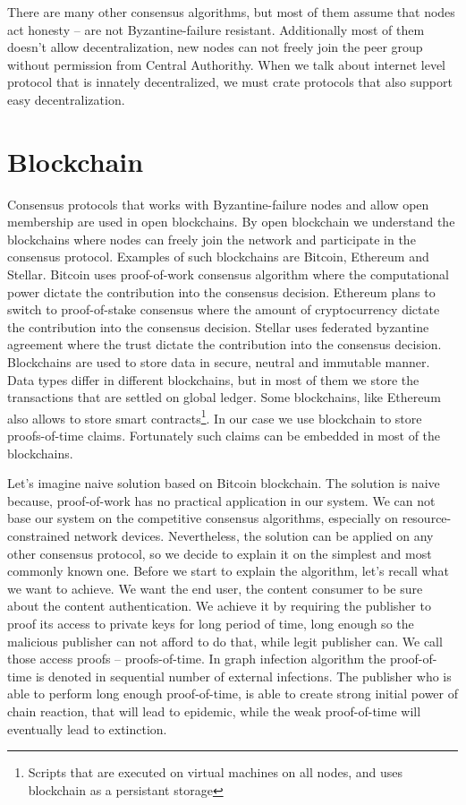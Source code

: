 \documentclass[nostrict]{szablonPG}
\begin{document}
There are many other consensus algorithms, but most of them assume that nodes act honesty -- are not Byzantine-failure resistant. Additionally most of them doesn't allow decentralization, new nodes can not freely join the peer group without permission from Central Authorithy. When we talk about internet level protocol that is innately decentralized, we must crate protocols that also support easy decentralization.

\section{Blockchain}
Consensus protocols that works with Byzantine-failure nodes and allow open membership are used in open blockchains. By open blockchain we understand the blockchains where nodes can freely join the network and participate in the consensus protocol. Examples of such blockchains are Bitcoin, Ethereum and Stellar. Bitcoin uses proof-of-work consensus algorithm where the computational power dictate the contribution into the consensus decision. Ethereum plans to switch to proof-of-stake consensus where the amount of cryptocurrency dictate the contribution into the consensus decision. Stellar uses federated byzantine agreement where the trust dictate the contribution into the consensus decision. Blockchains are used to store data in secure, neutral and immutable manner. Data types differ in different blockchains, but in most of them we store the transactions that are settled on global ledger. Some blockchains, like Ethereum also allows to store smart contracts\footnote{Scripts that are executed on virtual machines on all nodes, and uses blockchain as a persistant storage}. In our case we use blockchain to store proofs-of-time claims. Fortunately such claims can be embedded in most of the blockchains.

Let's imagine naive solution based on Bitcoin blockchain. The solution is naive because, proof-of-work has no practical application in our system. We can not base our system on the competitive consensus algorithms, especially on resource-constrained network devices. Nevertheless, the solution can be applied on any other consensus protocol, so we decide to explain it on the simplest and most commonly known one. 
Before we start to explain the algorithm, let's recall what we want to achieve. We want the end user, the content consumer to be sure about the content authentication. We achieve it by requiring the publisher to proof its access to private keys for long period of time, long enough so the malicious publisher can not afford to do that, while legit publisher can. We call those access proofs -- proofs-of-time. In graph infection algorithm the proof-of-time is denoted in sequential number of external infections. The publisher who is able to perform long enough proof-of-time, is able to create strong initial power of chain reaction, that will lead to epidemic, while the weak proof-of-time will eventually lead to extinction. 
\end{document}
